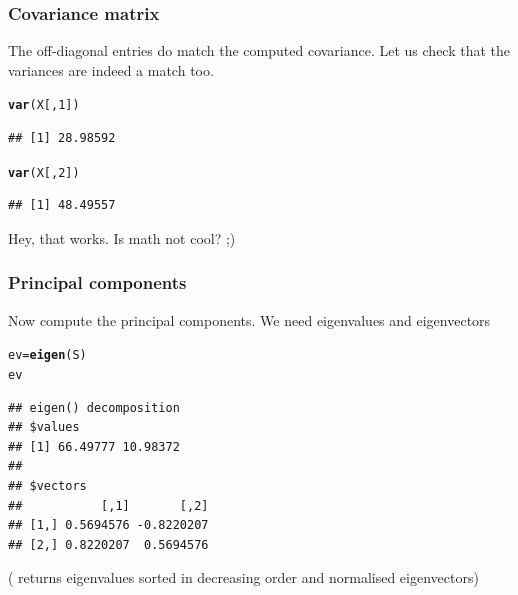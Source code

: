 \documentclass[aspectratio=169]{beamer}\usepackage[]{graphicx}\usepackage[]{xcolor}
\makeatletter
\newcommand{\hlnum}[1]{\textcolor[rgb]{0.686,0.059,0.569}{#1}}%
\newcommand{\hldef}[1]{\textcolor[rgb]{0.345,0.345,0.345}{#1}}%
\newcommand{\hlkwb}[1]{\textcolor[rgb]{0.69,0.353,0.396}{#1}}%
\newcommand{\hlkwd}[1]{\textcolor[rgb]{0.737,0.353,0.396}{\textbf{#1}}}%
\newenvironment{kframe}{%
 \def\at@end@of@kframe{}%
 \ifinner\ifhmode%
  \def\at@end@of@kframe{\end{minipage}}%
  \begin{minipage}{\columnwidth}%
 \fi\fi%
 \def\FrameCommand##1{\hskip\@totalleftmargin \hskip-\fboxsep
 \colorbox{shadecolor}{##1}\hskip-\fboxsep
     \hskip-\linewidth \hskip-\@totalleftmargin \hskip\columnwidth}%
 \MakeFramed {\advance\hsize-\width
   \@totalleftmargin\z@ \linewidth\hsize
   \@setminipage}}%
 {\par\unskip\endMakeFramed%
 \at@end@of@kframe}
\newenvironment{knitrout}{}{} %
\makeatother
\begin{document}
\begin{frame}[fragile]\frametitle{Covariance matrix}
The off-diagonal entries do match the computed covariance. Let us check that the variances are indeed a match too.


\begin{knitrout}
\color{fgcolor}\begin{kframe}
\begin{alltt}
\hlkwd{var}\hldef{(X[,}\hlnum{1}\hldef{])}
\end{alltt}
\begin{verbatim}
## [1] 28.98592
\end{verbatim}
\begin{alltt}
\hlkwd{var}\hldef{(X[,}\hlnum{2}\hldef{])}
\end{alltt}
\begin{verbatim}
## [1] 48.49557
\end{verbatim}
\end{kframe}
\end{knitrout}


Hey, that works. Is math not cool? ;)
\end{frame}


\begin{frame}[fragile]\frametitle{Principal components}
Now compute the principal components. We need eigenvalues and eigenvectors
\vfill
\begin{knitrout}
\color{fgcolor}\begin{kframe}
\begin{alltt}
\hldef{ev} \hlkwb{=} \hlkwd{eigen}\hldef{(S)}
\hldef{ev}
\end{alltt}
\begin{verbatim}
## eigen() decomposition
## $values
## [1] 66.49777 10.98372
## 
## $vectors
##           [,1]       [,2]
## [1,] 0.5694576 -0.8220207
## [2,] 0.8220207  0.5694576
\end{verbatim}
\end{kframe}
\end{knitrout}
\vfill
( returns eigenvalues sorted in decreasing order and normalised eigenvectors)
\end{frame}
\end{document}
